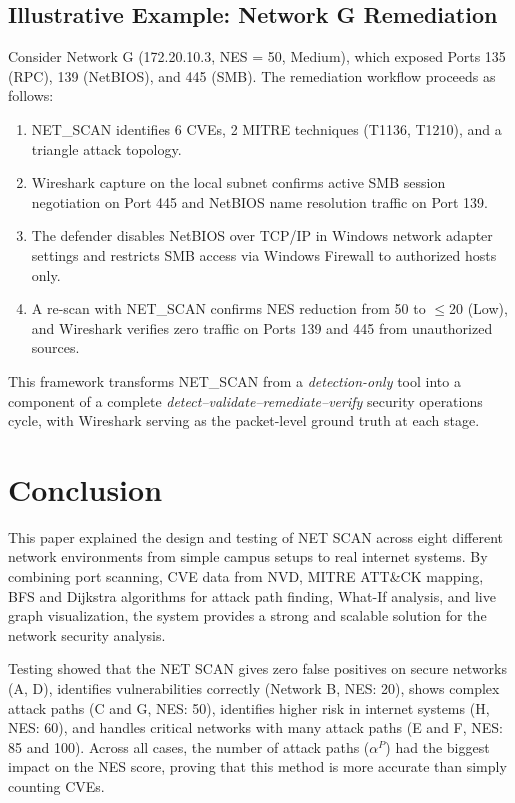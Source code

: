 \documentclass[conference]{IEEEtran}
\begin{document}
\subsection{Illustrative Example: Network G Remediation}
Consider Network G (172.20.10.3, NES = 50, Medium), which exposed Ports 135 (RPC), 139 (NetBIOS), and 445 (SMB). The remediation workflow proceeds as follows:
\begin{enumerate}
    \item NET\_SCAN identifies 6 CVEs, 2 MITRE techniques (T1136, T1210), and a triangle attack topology.
    \item Wireshark capture on the local subnet confirms active SMB session negotiation on Port 445 and NetBIOS name resolution traffic on Port 139.
    \item The defender disables NetBIOS over TCP/IP in Windows network adapter settings and restricts SMB access via Windows Firewall to authorized hosts only.
    \item A re-scan with NET\_SCAN confirms NES reduction from 50 to $\leq$20 (Low), and Wireshark verifies zero traffic on Ports 139 and 445 from unauthorized sources.
\end{enumerate}

This framework transforms NET\_SCAN from a \emph{detection-only} tool into a component of a complete \emph{detect--validate--remediate--verify} security operations cycle, with Wireshark serving as the packet-level ground truth at each stage.

\section{Conclusion}
This paper explained the design and testing of NET SCAN across eight different network environments from simple campus setups to real internet systems. By combining port scanning, CVE data from NVD, MITRE ATT\&CK mapping, BFS and Dijkstra algorithms for attack path finding, What-If analysis, and live graph visualization, the system provides a strong and scalable solution for the network security analysis.

Testing showed that the NET SCAN gives zero false positives on secure networks (A, D), identifies vulnerabilities correctly (Network B, NES: 20), shows complex attack paths (C and G, NES: 50), identifies higher risk in internet systems (H, NES: 60), and handles critical networks with many attack paths (E and F, NES: 85 and 100). Across all cases, the number of attack paths ($\alpha^{P}$) had the biggest impact on the NES score, proving that this method is more accurate than simply counting CVEs.
\end{document}
